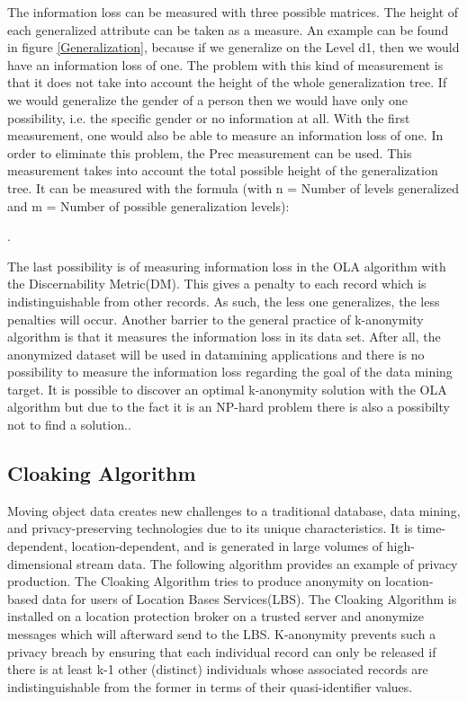 \documentclass{llncs}
\begin{document}
The information loss can be measured with three possible matrices. The height of each generalized attribute can be taken as a measure. An example can be found in figure  \ref{Generalization}, because if we generalize on the Level d1, then we would have an information loss of one. The problem with this kind of measurement is that it does not take into account the height of the whole generalization tree. If we would generalize the gender of a person then we would have only one possibility, i.e. the specific gender or no information at all. With the first measurement, one would also be able to measure an information loss of one. In order to eliminate this problem, the Prec measurement can be used. This measurement takes into account the total possible height of the generalization tree. It can be measured with the formula (with n = Number of levels generalized and m = Number of possible generalization levels):

 .

The last possibility is of measuring information loss in the OLA algorithm with the Discernability Metric(DM). This gives a penalty to each record which is indistinguishable from other records. As such, the less one generalizes, the less penalties will occur. Another barrier to the general practice of k-anonymity algorithm is that it measures the information loss in its data set. After all, the anonymized dataset will be used in datamining applications and there is no possibility to measure the information loss regarding the goal of the data mining target. It is possible to discover an optimal k-anonymity solution with the OLA algorithm but due to the fact it is an NP-hard problem there is also a possibilty not to find a solution.\cite{el2009globally}.
\subsection{Cloaking Algorithm}
Moving object data creates new challenges to a traditional database, data mining, and privacy-preserving technologies due to its unique characteristics. It is time-dependent, location-dependent, and is generated in large volumes of high-dimensional stream data. The following algorithm provides an example of privacy production. The Cloaking Algorithm tries to produce anonymity on location-based data for users of Location Bases Services(LBS). The Cloaking Algorithm is installed on a location protection broker on a trusted server and anonymize messages which will afterward send to the LBS. K-anonymity prevents such a privacy breach by ensuring that each individual record can only be released if there is at least k-1 other (distinct) individuals whose associated records are indistinguishable from the former in terms of their quasi-identifier values.
\end{document}
